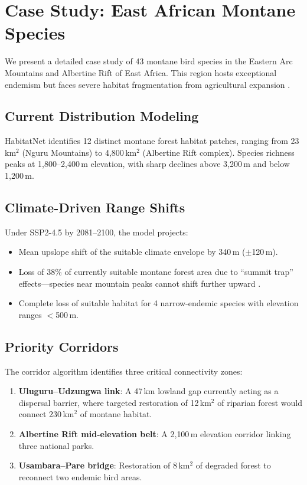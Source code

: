 \section{Case Study: East African Montane Species}

\label{sec:case_study}

We present a detailed case study of 43 montane bird species in the
Eastern Arc Mountains and Albertine Rift of East Africa. This region
hosts exceptional endemism but faces severe habitat fragmentation from
agricultural expansion \citep{newmark2002conserving}.

\subsection{Current Distribution Modeling}

HabitatNet identifies 12 distinct montane forest habitat patches, ranging
from 23\,km$^2$ (Nguru Mountains) to 4{,}800\,km$^2$ (Albertine Rift
complex). Species richness peaks at 1{,}800--2{,}400\,m elevation, with
sharp declines above 3{,}200\,m and below 1{,}200\,m.

\subsection{Climate-Driven Range Shifts}

Under SSP2-4.5 by 2081--2100, the model projects:
\begin{itemize}
  \item Mean upslope shift of the suitable climate envelope by
    340\,m ($\pm$120\,m).
  \item Loss of 38\% of currently suitable montane forest area due to
    ``summit trap'' effects---species near mountain peaks cannot
    shift further upward \citep{freeman2018climate}.
  \item Complete loss of suitable habitat for 4 narrow-endemic species
    with elevation ranges $<$500\,m.
\end{itemize}

\subsection{Priority Corridors}

The corridor algorithm identifies three critical connectivity zones:
\begin{enumerate}
  \item \textbf{Uluguru--Udzungwa link}: A 47\,km lowland gap currently
    acting as a dispersal barrier, where targeted restoration of 12\,km$^2$
    of riparian forest would connect 230\,km$^2$ of montane habitat.
  \item \textbf{Albertine Rift mid-elevation belt}: A 2{,}100\,m
    elevation corridor linking three national parks.
  \item \textbf{Usambara--Pare bridge}: Restoration of 8\,km$^2$ of
    degraded forest to reconnect two endemic bird areas.
\end{enumerate}


